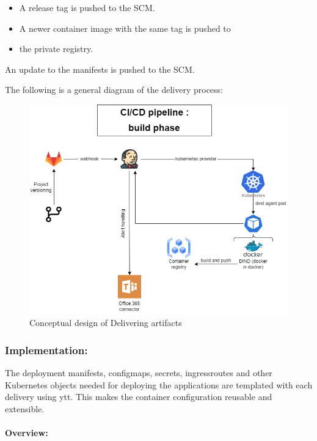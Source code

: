 \begin{itemize}[label={--}]
\item A release tag is pushed to the SCM. 
\item A newer container image with the same tag is pushed to \item the private registry. 
\end{itemize}

An update to the manifests is pushed to the SCM. 

The following is a general diagram of the delivery process: 

\begin{figure}[H]\centering
\includegraphics[width=1.0\textwidth,angle=00]{assets/f49.png}
\caption{Conceptual design of Delivering artifacts }
\label{fig:Conceptual design of Delivering artifacts }
\end{figure}

\subsubsection{Implementation: }

The deployment manifests, configmaps, secrets, ingressroutes and other Kubernetes objects needed for deploying the applications are templated with each delivery using ytt. This makes the container configuration reusable and extensible.  


\paragraph{Overview: }

